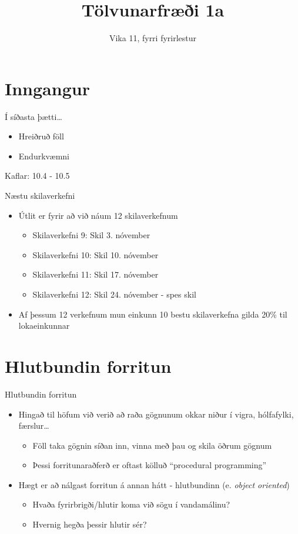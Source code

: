\documentclass{beamer}
\title{Tölvunarfræði 1a}
\subtitle{Vika 11, fyrri fyrirlestur}
\begin{document}
\begin{frame}
\titlepage
\end{frame}

\section{Inngangur}

\begin{frame}{Í síðasta þætti\ldots}
\begin{itemize}
 \item Hreiðruð föll
 \item Endurkvæmni
\end{itemize}
Kaflar: 10.4 - 10.5
\end{frame}

\begin{frame}{Næstu skilaverkefni}
\begin{itemize}
 \item Útlit er fyrir að við náum 12 skilaverkefnum
 \begin{itemize}
  \item Skilaverkefni 9: Skil 3. nóvember
  \item Skilaverkefni 10: Skil 10. nóvember 
  \item Skilaverkefni 11: Skil 17. nóvember
  \item Skilaverkefni 12: Skil 24. nóvember - spes skil
 \end{itemize}
 \item Af þessum 12 verkefnum mun einkunn 10 bestu skilaverkefna gilda 20\% til lokaeinkunnar
\end{itemize}
\end{frame}

\section{Hlutbundin forritun}

\begin{frame}{Hlutbundin forritun}
\begin{itemize}
 \item Hingað til höfum við verið að raða gögnunum okkar niður í vigra, hólfafylki, færslur\ldots
 \begin{itemize}
  \item Föll taka gögnin síðan inn, vinna með þau og skila öðrum gögnum
  \item Þessi forritunaraðferð er oftast kölluð ``procedural programming''
 \end{itemize}
 \item Hægt er að nálgast forritun á annan hátt - hlutbundinn (e. \emph{object oriented})
 \begin{itemize}
  \item Hvaða fyrirbrigði/hlutir koma við sögu í vandamálinu?
  \item Hvernig hegða þessir hlutir sér?
 \end{itemize}
\end{itemize}
\end{frame}
\end{document}
